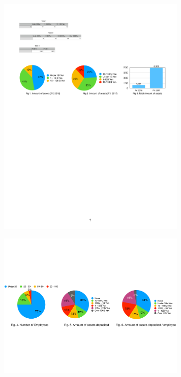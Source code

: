 \begin{center}
\includegraphics[width=9cm,pagebox=cropbox,clip]{fig1.pdf}
\end{center}

\begin{center}
\includegraphics[width=9cm,pagebox=cropbox,clip]{fig2.pdf}
\end{center}

